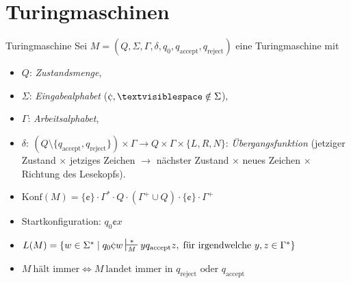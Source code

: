\documentclass[a4paper,10pt]{article}
\begin{document}
\section{Turingmaschinen}
\begin{mainbox}{Turingmaschine}
    Sei $M = (Q, \Sigma, \Gamma, \delta, q_0, q_\textrm{accept}, q_\textrm{reject})$ eine Turingmaschine mit
    \begin{itemize}
        \item $Q$: \emph{Zustandsmenge},
        \item $\Sigma$: \emph{Eingabealphabet} ($\cent, \textvisiblespace \notin \Sigma$),
        \item $\Gamma$: \emph{Arbeitsalphabet},
        \item $\delta:\: (Q \setminus \{q_\textrm{accept}, q_\textrm{reject}\}) \times \Gamma \to Q \times \Gamma \times \{L, R, N\}$: \emph{Übergangsfunktion} (jetziger Zustand $\times$ jetziges Zeichen $\to$ nächster Zustand $\times$ neues Zeichen $\times$ Richtung des Lesekopfs).
    \end{itemize}
\end{mainbox}
\begin{itemize}
    \item $\textrm{Konf}(M) = \{\cent\} \cdot \Gamma^* \cdot Q \cdot (\Gamma^+ \cup Q) \cdot \{\cent\} \cdot \Gamma^+$
    \item Startkonfiguration: $q_0 \cent x$
    \item $L(M) = \{w \in \Sigma^* \;|\; q_0 \cent w \sststile{M}{*} y q_\textrm{accept} z,\;\text{für irgendwelche}\ y, z \in \Gamma^*\}$
    \item $M\ \text{hält immer} \iff M\ \text{landet immer in $q_\textrm{reject}$ oder $q_\textrm{accept}$}$
\end{itemize}
\end{document}
